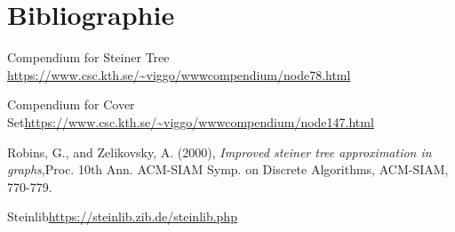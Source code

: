 \documentclass{article}
\begin{document}
\section{Bibliographie}
\begin{thebibliography}{9}

 \label{comp-steiner}
Compendium for Steiner Tree \url{https://www.csc.kth.se/~viggo/wwwcompendium/node78.html}

 \label{comp-Cover}
Compendium for Cover Set\url{https://www.csc.kth.se/~viggo/wwwcompendium/node147.html}

 \label{approx}
Robins, G., and Zelikovsky, A. (2000), \textit{Improved steiner tree approximation in graphs},Proc. 10th Ann. ACM-SIAM Symp. on Discrete Algorithms, ACM-SIAM, 770-779.

 \label{steinlib}
Steinlib\url{https://steinlib.zib.de/steinlib.php}

\end{thebibliography}
\end{document}
